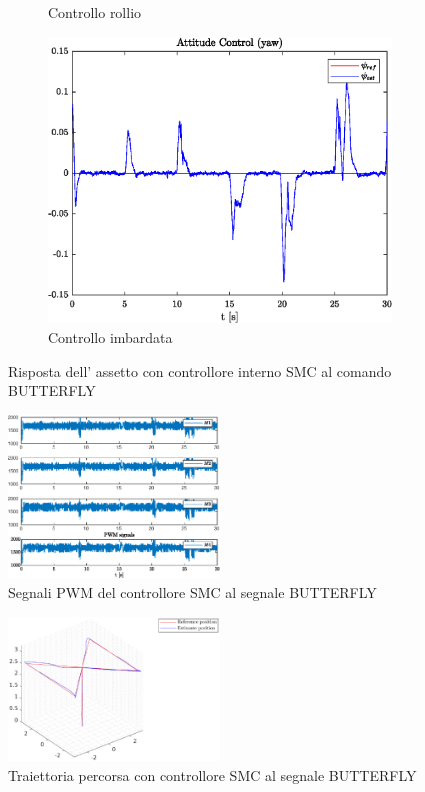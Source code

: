 \begin{figure}
\begin{subfigure}{0.45\textwidth}
		\caption{Controllo rollio}
	\end{subfigure}
	\hfill
	\begin{subfigure}{0.45\textwidth}
		\centering
		\includegraphics[width=1\textwidth]{Simulazioni/Figure/SMC/BUTTERFLY/AttitudeControlYaw}
		\caption{Controllo imbardata}
	\end{subfigure}
	\caption{Risposta dell' assetto con controllore interno SMC al comando BUTTERFLY}
\end{figure}

\begin{figure}
	\centering
	\includegraphics[width=0.5\textwidth]{Simulazioni/Figure/SMC/BUTTERFLY/PWM}
	\caption{Segnali PWM del controllore SMC al segnale BUTTERFLY}
\end{figure}
\begin{figure}
	\centering
	\includegraphics[width=0.5\textwidth]{Simulazioni/Figure/SMC/BUTTERFLY/Trajectory}
	\caption{Traiettoria percorsa con controllore SMC al segnale BUTTERFLY}
\end{figure}

